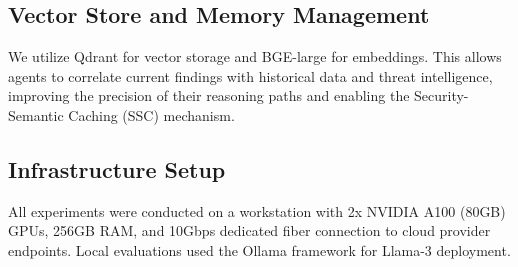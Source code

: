 \documentclass[conference,compsoc]{IEEEtran}
\begin{document}
\subsection{Vector Store and Memory Management}
We utilize Qdrant for vector storage and BGE-large for embeddings. This allows agents to correlate current findings with historical data and threat intelligence, improving the precision of their reasoning paths and enabling the Security-Semantic Caching (SSC) mechanism.

\subsection{Infrastructure Setup}
All experiments were conducted on a workstation with 2x NVIDIA A100 (80GB) GPUs, 256GB RAM, and 10Gbps dedicated fiber connection to cloud provider endpoints. Local evaluations used the Ollama framework for Llama-3 deployment.
\end{document}
